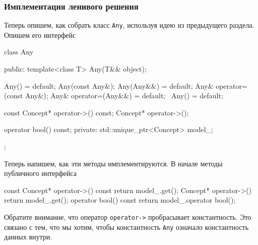 \subsubsection{Имплементация ленивого решения}

Теперь опишем, как собрать класс \verb"Any", используя идею из предыдущего раздела.
Опишем его интерфейс
\begin{cppcode}
class Any {
public:
  template<class T>
  Any(T&& object);

  Any() = default;
  Any(const Any&);
  Any(Any&&) = default;
  Any& operator=(const Any&);
  Any& operator=(Any&&) = default;
  ~Any() = default;
  
  const Concept* operator->() const;
  Concept* operator->();
  
  operator bool() const;
private:
  std::unique_ptr<Concept> model_;
};
\end{cppcode}
Теперь напишем, как эти методы имплементируются.
В начале методы публичного интерфейса
\begin{cppcode}
const Concept* operator->() const {
  return model_.get();
}
Concept* operator->() {
  return model_.get();
}
operator bool() const {
  return model_.operator bool();
}
\end{cppcode}
Обратите внимание, что оператор \verb"operator->" пробрасывает константность.
Это связано с тем, что мы хотим, чтобы константность \verb"Any" означало константность данных внутри.

